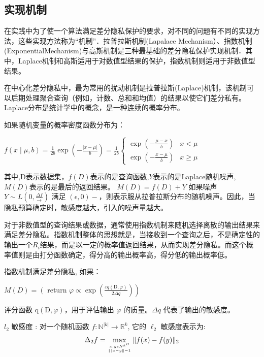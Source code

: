 \subsection{实现机制}
在实践中为了使一个算法满足差分隐私保护的要求，对不同的问题有不同的实现方法，这些实现方法称为“机制”．拉普拉斯机制(Lapalace Mechanism）、指数机制(ExponentialMechanism)与高斯机制是三种最基础的差分隐私保护实现机制．其中，Laplace机制和高斯适用于对数值型结果的保护，指数机制则适用于非数值型结果。

在中心化差分隐私中，最为常用的扰动机制是拉普拉斯(Laplace)机制，该机制可以后期处理聚合查询（例如，计数、总和和均值）的结果以使它们差分私有。
Laplace分布是统计学中的概念，是一种连续的概率分布。

\begin{define}[拉普拉斯机制]\label{拉普拉斯机制}
如果随机变量的概率密度函数分布为：

$f(x \mid \mu, b)=\frac{1}{2 b} \exp \left(-\frac{|x-\mu|}{b}\right)=\frac{1}{2 b}\left\{\begin{array}{ll}\exp \left(-\frac{\mu-x}{b}\right) & x<\mu \\ \exp \left(-\frac{x-\mu}{b}\right) & x \geq \mu\end{array}\right.$

其中,D表示数据集，$f(D)$表示的是查询函数,$Y$表示的是Laplace随机噪声,$M(D)$表示的是最后的返回结果。
$M(D)=f(D)+Y$
如果噪声 $Y \sim L\left(0, \frac{\Delta f}{\longrightarrow}\right)$ 满足 $(\epsilon, 0)-$，则表示服从拉普拉斯分布的随机噪声。因此，当隐私预算确定时，敏感度越大，引入的噪声量越大。
\end{define}

对于非数值型的查询结果或数据，通常使用指数机制来随机选择离散的输出结果来满足差分隐私。指数机制整体的思想就是，当接收到一个查询之后，不是确定性的输出一个$R_{i}$结果，而是以一定的概率值返回结果，从而实现差分隐私。而这个概率值则是由打分函数确定，得分高的输出概率高，得分低的输出概率低。

\begin{define}[指数机制]\label{指数机制}
指数机制满足差分隐私, 如果：

$M(D)=\left(\right.$ return $\left.\varphi \propto \exp \left(\frac{\varepsilon q(\mathrm{D}, \varphi)}{2 \Delta q}\right)\right)$

评分函数 $\mathrm{q}(\mathrm{D}, \varphi)$，用于评估输出 $\varphi$ 的质量。$\Delta q$ 代表了输出的敏感度。
\end{define}

$l_{2}$ 敏感度 : 对一个随机函数 $f: \mathbb{N}^{|k|} \rightarrow \mathbb{R}^{k}$, 它的 $\ell_{2}$ 敏感度表示为:
$$
\Delta_{2} f=\max _{x, y e N^{k^{\prime \prime}} \atop \|[x-y \|-1}\|f(x)-f(y)\|_{2}
$$


